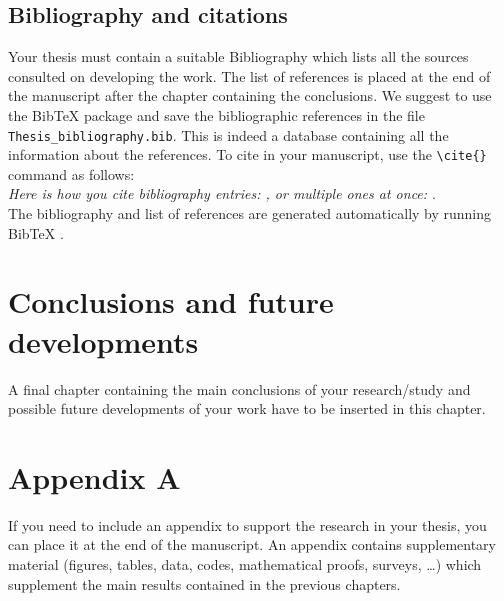 \documentclass{Configuration_Files/PoliMi3i_thesis}
\begin{document}
\section{Bibliography and citations}
Your thesis must contain a suitable Bibliography which lists all the sources consulted on developing the work.
The list of references is placed at the end of the manuscript after the chapter containing the conclusions.
We suggest to use the BibTeX package and save the bibliographic references  in the file \verb|Thesis_bibliography.bib|.
This is indeed a database containing all the information about the references. To cite in your manuscript, use the \verb|\cite{}| command as follows:
\\
\textit{Here is how you cite bibliography entries: \cite{knuth74}, or multiple ones at once: \cite{knuth92,lamport94}}.
\\
The bibliography and list of references are generated automatically by running BibTeX \cite{bibtex}.

\chapter{Conclusions and future developments}
\label{ch:conclusions}%
A final chapter containing the main conclusions of your research/study
and possible future developments of your work have to be inserted in this chapter.




\cleardoublepage
{} %
\appendix
\chapter{Appendix A}
If you need to include an appendix to support the research in your thesis, you can place it at the end of the manuscript.
An appendix contains supplementary material (figures, tables, data, codes, mathematical proofs, surveys, \dots)
which supplement the main results contained in the previous chapters.
\end{document}
